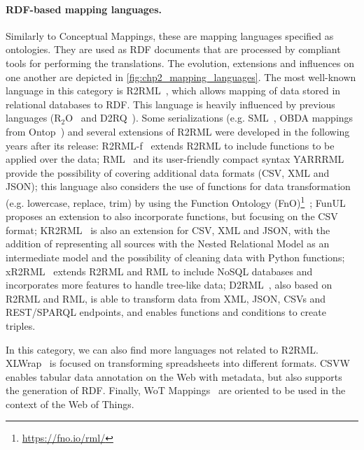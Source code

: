\noindent\paragraph{\textbf{RDF-based mapping languages.}} Similarly to Conceptual Mappings, these are mapping languages specified as ontologies. They are used as RDF documents that are processed by compliant tools for performing the translations. The evolution, extensions and influences on one another are depicted in \cref{fig:chp2_mapping_languages}. The most well-known language in this category is R2RML~\citep{das2012r2rml}, which allows mapping of data stored in relational databases to RDF. This language is heavily influenced by previous languages (R$_2$O~\citep{barrasa2004r2o} and D2RQ~\citep{bizer2004d2rq}). Some serializations (e.g. SML~\citep{Stadler2015sml}, OBDA mappings from Ontop~\citep{rodriguez2015efficient}) and several extensions of R2RML were developed in the following years after its release: R2RML-f~\citep{debruyne2016r2rmlf} extends R2RML to include functions to be applied over the data; RML~\citep{Dimou2014rml} and its user-friendly compact syntax YARRRML~\citep{Heyvaert2018yarrrml} provide the possibility of covering additional data formats (CSV, XML and JSON); this language also considers the use of functions for data transformation (e.g. lowercase, replace, trim) by using the Function Ontology (FnO)\footnote{\url{https://fno.io/rml/}}~\citep{DeMeester2017fno_dbpedia}; FunUL~\citep{junior2016funul} proposes an extension to also incorporate functions, but focusing on the CSV format; KR2RML~\citep{slepicka2015kr2rml} is also an extension for CSV, XML and JSON, with the addition of representing all sources with the Nested Relational Model as an intermediate model and the possibility of cleaning data with Python functions; xR2RML~\citep{michel2015xr2rml} extends R2RML and RML to include NoSQL databases and incorporates more features to handle tree-like data; D2RML~\citep{chortaras2018d2rml}, also based on R2RML and RML, is able to transform data from XML, JSON, CSVs and REST/SPARQL endpoints, and enables functions and conditions to create triples. 

In this category, we can also find more languages not related to R2RML. XLWrap~\citep{langegger2009xlwrap} is focused on transforming spreadsheets into different formats. CSVW~\citep{Tennison2015csvw} enables tabular data annotation on the Web with metadata, but also supports the generation of RDF. Finally, WoT Mappings~\citep{cimmino2020ewot} are oriented to be used in the context of the Web of Things.

